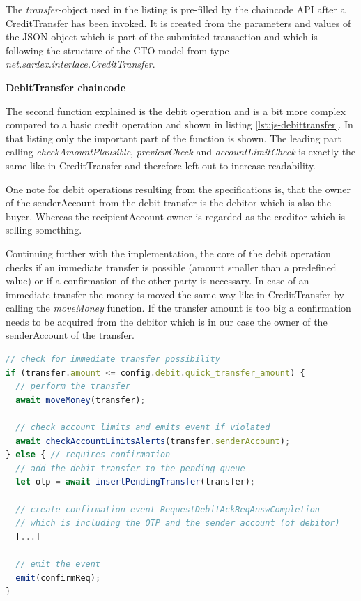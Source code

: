 The \textit{transfer}-object used in the listing is pre-filled by the chaincode API after a CreditTransfer has been invoked. It is created from the parameters and values of the JSON-object which is part of the submitted transaction and which is following the structure of the CTO-model from type \textit{net.sardex.interlace.CreditTransfer}.

\textbf{DebitTransfer chaincode}

The second function explained is the debit operation and is a bit more complex compared to a basic credit operation and shown in listing \ref{lst:js-debittransfer}. In that listing only the important part of the function is shown. The leading part calling \textit{checkAmountPlausible}, \textit{previewCheck} and \textit{accountLimitCheck} is exactly the same like in CreditTransfer and therefore left out to increase readability.

One note for debit operations resulting from the specifications is, that the owner of the senderAccount from the debit transfer is the debitor which is also the buyer. Whereas the recipientAccount owner is regarded as the creditor which is selling something.

Continuing further with the implementation, the core of the debit operation checks if an immediate transfer is possible (amount smaller than a predefined value) or if a confirmation of the other party is necessary. In case of an immediate transfer the money is moved the same way like in CreditTransfer by calling the \textit{moveMoney} function. If the transfer amount is too big a confirmation needs to be acquired from the debitor which is in our case the owner of the senderAccount of the transfer.

\begin{center}
\begin{minipage}{0.8\textwidth}
\small
\begin{lstlisting}[language=javascript,firstnumber=1,caption={\bf\small DebitTransfer JavaScript}, captionpos=b,label=lst:js-debittransfer]
// check for immediate transfer possibility
if (transfer.amount <= config.debit.quick_transfer_amount) {
  // perform the transfer
  await moveMoney(transfer);

  // check account limits and emits event if violated
  await checkAccountLimitsAlerts(transfer.senderAccount);
} else { // requires confirmation
  // add the debit transfer to the pending queue
  let otp = await insertPendingTransfer(transfer);

  // create confirmation event RequestDebitAckReqAnswCompletion
  // which is including the OTP and the sender account (of debitor)
  [...]

  // emit the event
  emit(confirmReq);
}
\end{lstlisting}
\end{minipage}
\end{center}

